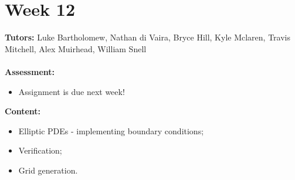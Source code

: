 \documentclass[11pt,a4paper]{report}
\begin{document}
	
	\begingroup
	\makeatletter
	\let\clearpage\relax
	\vspace*{\fill}%
	\vspace*{\dimexpr-50\p@-\baselineskip}
	\chapter*{Week 12}
	\textbf{Tutors:} Luke Bartholomew, Nathan di Vaira, Bryce Hill, Kyle Mclaren, Travis Mitchell, Alex Muirhead, William Snell \\\\
	\textbf{Assessment:} 
	\begin{itemize}
		\item Assignment is due next week!
	\end{itemize}	
	\textbf{Content:}
	\begin{itemize}
		\item Elliptic PDEs - implementing boundary conditions;
		\item Verification;
		\item Grid generation. 
	\end{itemize}
	\vspace*{\fill}
	\endgroup
	
\end{document}
